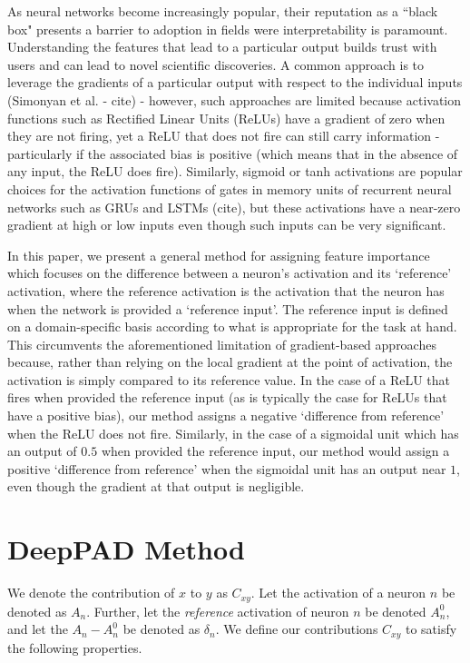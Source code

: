 \documentclass{article}
\begin{document}
As neural networks become increasingly popular, their reputation as a ``black box" presents a barrier to adoption in fields were interpretability is paramount. Understanding the features that lead to a particular output builds trust with users and can lead to novel scientific discoveries. A common approach is to leverage the gradients of a particular output with respect to the individual inputs (Simonyan et al. - cite) - however, such approaches are limited because activation functions such as Rectified Linear Units (ReLUs) have a gradient of zero when they are not firing, yet a ReLU that does not fire can still carry information - particularly if the associated bias is positive (which means that in the absence of any input, the ReLU does fire). Similarly, sigmoid or tanh activations are popular choices for the activation functions of gates in memory units of recurrent neural networks such as GRUs and LSTMs (cite), but these activations have a near-zero gradient at high or low inputs even though such inputs can be very significant.

In this paper, we present a general method for assigning feature importance which focuses on the difference between a neuron's activation and its `reference' activation, where the reference activation is the activation that the neuron has when the network is provided a `reference input'. The reference input is defined on a domain-specific basis according to what is appropriate for the task at hand. This circumvents the aforementioned limitation of gradient-based approaches because, rather than relying on the local gradient at the point of activation, the activation is simply compared to its reference value. In the case of a ReLU that fires when provided the reference input (as is typically the case for ReLUs that have a positive bias), our method assigns a negative `difference from reference' when the ReLU does not fire. Similarly, in the case of a sigmoidal unit which has an output of $0.5$ when provided the reference input, our method would assign a positive `difference from reference' when the sigmoidal unit has an output near $1$, even though the gradient at that output is negligible.

\section{DeepPAD Method}
\label{PAD}

We denote the contribution of $x$ to $y$ as $C_{xy}$. Let the activation of a neuron $n$ be denoted as $A_n$. Further, let the \emph{reference} activation of neuron $n$ be denoted $A_n^0$, and let the $A_n - A_n^0$ be denoted as $\delta_n$. We define our contributions $C_{xy}$ to satisfy the following properties.
\end{document}
